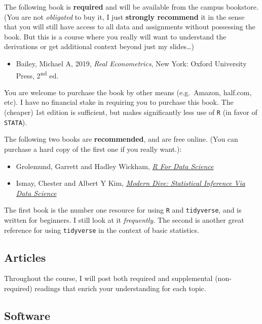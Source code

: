 \documentclass{article}
\providecommand{\tightlist}{%
  \setlength{\itemsep}{0pt}\setlength{\parskip}{0pt}}
\begin{document}
The following book is \textbf{required} and will be available from the
campus bookstore. (You are not \emph{obligated} to buy it, I just
\textbf{strongly recommend} it in the sense that you will still have
access to all data and assignments without possessing the book. But this
is a course where you really will want to understand the derivations or
get additional context beyond just my slides\ldots)

\begin{itemize}
\tightlist
\item
  Bailey, Michael A, 2019, \emph{Real Econometrics}, New York: Oxford
  University Press, 2\textsuperscript{nd} ed.
\end{itemize}

You are welcome to purchase the book by other means (e.g.~Amazon,
half.com, etc). I have no financial stake in requiring you to purchase
this book. The (cheaper) 1st edition is sufficient, but makes
significantly less use of \texttt{R} (in favor of \texttt{STATA}).

The following two books are \textbf{recommended}, and are free online.
(You can purchase a hard copy of the first one if you really want.):

\begin{itemize}
\tightlist
\item
  Grolemund, Garrett and Hadley Wickham,
  \href{https://r4ds.had.co.nz/}{\emph{R For Data Science}}
\item
  Ismay, Chester and Albert Y Kim,
  \href{https://moderndive.com/}{\emph{Modern Dive: Statistical
  Inference Via Data Science}}
\end{itemize}

The first book is the number one resource for using \texttt{R} and
\texttt{tidyverse}, and is written for beginners. I still look at it
\emph{frequently.} The second is another great reference for using
\texttt{tidyverse} in the context of basic statistics.

\hypertarget{articles}{%
\subsection*{Articles}\label{articles}}

Throughout the course, I will post both required and supplemental
(non-required) readings that enrich your understanding for each topic.

\hypertarget{software}{%
\subsection*{Software}\label{software}}
\end{document}
